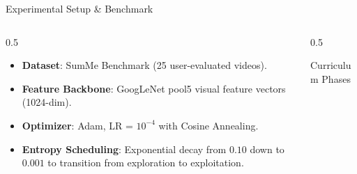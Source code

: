 \documentclass[aspectratio=169]{beamer}
\begin{document}
\begin{frame}{Experimental Setup \& Benchmark}
    \begin{columns}
        \begin{column}{0.5\textwidth}
            \begin{itemize}
                \item \textbf{Dataset}: SumMe Benchmark (25 user-evaluated videos).
                \item \textbf{Feature Backbone}: GoogLeNet pool5 visual feature vectors (1024-dim).
                \item \textbf{Optimizer}: Adam, LR = $10^{-4}$ with Cosine Annealing.
                \item \textbf{Entropy Scheduling}: Exponential decay from $0.10$ down to $0.001$ to transition from exploration to exploitation.
            \end{itemize}
        \end{column}
        \begin{column}{0.5\textwidth}
            \begin{block}{Curriculum Phases}
                \centering
            \end{block}
        \end{column}
    \end{columns}
\end{frame}
\end{document}
